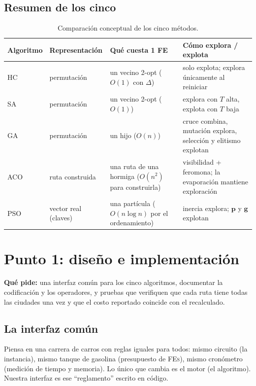 \documentclass[11pt,a4paper]{article}
\newcommand{\FEs}{\textsc{FEs}}
\begin{document}
\subsection{Resumen de los cinco}
\begin{table}[H]
\centering\small
\begin{tabular}{>{\raggedright}p{2.1cm}>{\raggedright}p{2.6cm}>{\raggedright}p{3.4cm}>{\raggedright\arraybackslash}p{5.4cm}}
\toprule
Algoritmo & Representación & Qué cuesta 1 FE & Cómo explora / explota \\
\midrule
HC & permutación & un vecino 2-opt ($O(1)$ con $\Delta$) & solo explota; explora únicamente al reiniciar \\
SA & permutación & un vecino 2-opt ($O(1)$) & explora con $T$ alta, explota con $T$ baja \\
GA & permutación & un hijo ($O(n)$) & cruce combina, mutación explora, selección y elitismo explotan \\
ACO & ruta construida & una ruta de una hormiga ($O(n^2)$ para construirla) & visibilidad + feromona; la evaporación mantiene exploración \\
PSO & vector real (claves) & una partícula ($O(n\log n)$ por el ordenamiento) & inercia explora; $\mathbf{p}$ y $\mathbf{g}$ explotan \\
\bottomrule
\end{tabular}
\caption{Comparación conceptual de los cinco métodos.}
\end{table}

\section{Punto 1: diseño e implementación}\label{sec:p1}
\textbf{Qué pide:} una interfaz común para los cinco algoritmos, documentar la codificación y los operadores, y pruebas que verifiquen que cada
ruta tiene todas las ciudades una vez y que el costo reportado coincide con el recalculado.

\subsection{La interfaz común}

\begin{idea}
Piensa en una carrera de carros con reglas iguales para todos: mismo circuito (la instancia), mismo tanque de gasolina (presupuesto de \FEs),
mismo cronómetro (medición de tiempo y memoria). Lo único que cambia es el motor (el algoritmo).
Nuestra interfaz es ese ``reglamento'' escrito en código.
\end{idea}
\end{document}
